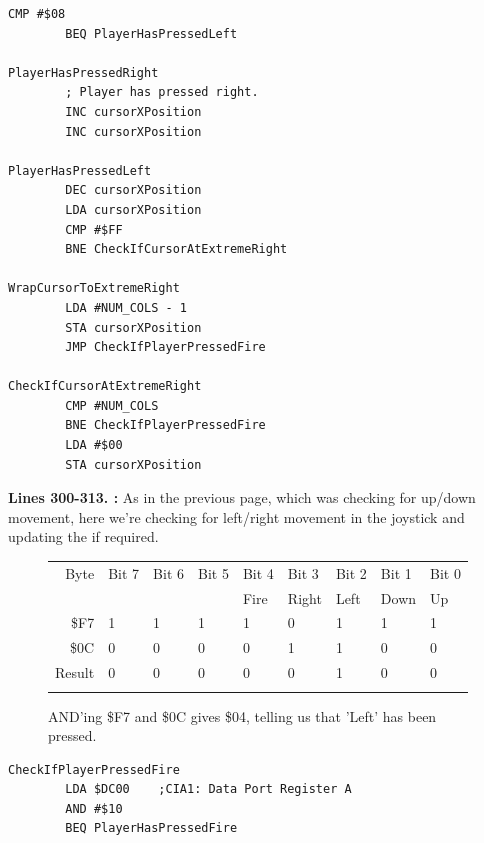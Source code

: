 {\begin{lstlisting}[caption= Second part of the Interrupt Handler.]
        CMP #$08
        BEQ PlayerHasPressedLeft

PlayerHasPressedRight
        ; Player has pressed right.
        INC cursorXPosition
        INC cursorXPosition

PlayerHasPressedLeft   
        DEC cursorXPosition
        LDA cursorXPosition
        CMP #$FF
        BNE CheckIfCursorAtExtremeRight

WrapCursorToExtremeRight
        LDA #NUM_COLS - 1
        STA cursorXPosition
        JMP CheckIfPlayerPressedFire

CheckIfCursorAtExtremeRight   
        CMP #NUM_COLS
        BNE CheckIfPlayerPressedFire
        LDA #$00
        STA cursorXPosition

\end{lstlisting}
\clearpage
{}
\textbf{Lines 300-313. :} As in the previous page, which was checking
for up/down movement, here we're checking for left/right movement in the joystick and updating the  if required.

\begin{figure}[H]
  {
    \setlength{\tabcolsep}{3.0pt}
    \setlength\cmidrulewidth{\heavyrulewidth} %
    \begin{adjustbox}{width=7cm,center}

      \begin{tabular}{rllllllll}
        \toprule
        Byte & Bit 7 & Bit 6 & Bit 5 & Bit 4 & Bit 3 & Bit 2 & Bit 1 & Bit 0        \\
             &       &       &       & Fire  & Right & Left  & Down  & Up           \\
        \midrule
        \$F7 & 1 & 1 & 1 & 1 & 0 & 1 & 1 & 1 \\
        \$0C & 0 & 0 & 0 & 0 & 1 & 1 & 0 & 0 \\
        \midrule
        Result & 0 & 0 & 0 & 0 & 0 & 1 & 0 & 0 \\
        \addlinespace
        \bottomrule
      \end{tabular}
    \end{adjustbox}
    }\caption*{AND'ing \$F7 and \$0C gives \$04, telling us that 'Left' has been pressed.}
\end{figure}

\clearpage
\begin{lstlisting}[caption= Third part of the Interrupt Handler.]
CheckIfPlayerPressedFire   
        LDA $DC00    ;CIA1: Data Port Register A
        AND #$10
        BEQ PlayerHasPressedFire


\end{lstlisting}}
